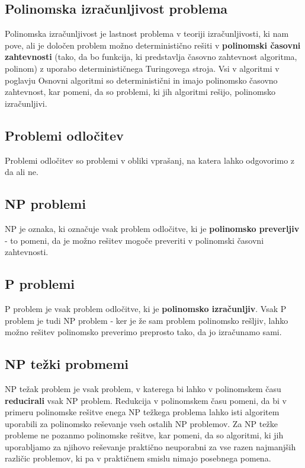 \documentclass[11pt]{article}
\begin{document}
\subsection{Polinomska izračunljivost problema}

Polinomska izračunljivost je lastnost problema v teoriji izračunljivosti, ki nam pove, ali je določen problem možno deterministično rešiti v \textbf{polinomski časovni zahtevnosti} (tako, da bo funkcija, ki predstavlja časovno zahtevnost algoritma, polinom) z uporabo determinističnega Turingovega stroja. Vsi v algoritmi v poglavju Osnovni algoritmi so deterministični in imajo polinomsko časovno zahtevnost, kar pomeni, da so problemi, ki jih algoritmi rešijo, polinomsko izračunljivi.

\subsection{Problemi odločitev}

Problemi odločitev so problemi v obliki vprašanj, na katera lahko odgovorimo z da ali ne.

\subsection{NP problemi}

NP je oznaka, ki označuje vsak problem odločitve, ki je \textbf{polinomsko preverljiv} - to pomeni, da je možno rešitev mogoče preveriti v polinomski časovni zahtevnosti. \cite{np}

\subsection{P problemi}

P problem je vsak problem odločitve, ki je \textbf{polinomsko izračunljiv}. Vsak P problem je tudi NP problem - ker je že sam problem polinomsko rešljiv, lahko možno rešitev polinomsko preverimo preprosto tako, da jo izračunamo sami. \cite{p}

\subsection{NP težki probmemi}

NP težak problem je vsak problem, v katerega bi lahko v polinomskem času \textbf{reducirali} vsak NP problem. Redukcija v polinomskem času pomeni, da bi v primeru polinomske rešitve enega NP težkega problema lahko isti algoritem uporabili za polinomsko reševanje vseh ostalih NP problemov. Za NP težke probleme ne pozanmo polinomske rešitve, kar pomeni, da so algoritmi, ki jih uporabljamo za njihovo reševanje praktično neuporabni za vse razen najmanjših različic problemov, ki pa v praktičnem smislu nimajo posebnega pomena. \cite{nph}
\end{document}
